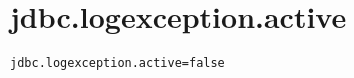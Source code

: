\section{jdbc.logexception.active}
\label{configuration:JdbcLogexceptionActive}
\AvailableInJavaOnly{\TODO}
\begin{lstlisting}[style=Props,caption={Usage example for \textit{jdbc.logexception.active}}]
jdbc.logexception.active=false
\end{lstlisting}